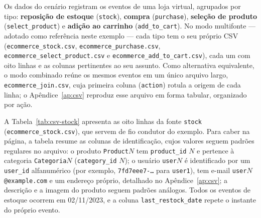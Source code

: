 Os dados do cenário registram os eventos de uma loja virtual, agrupados por tipo:
\textbf{reposição de estoque} (\texttt{stock}), \textbf{compra} (\texttt{purchase}),
\textbf{seleção de produto} (\texttt{select\_product}) e \textbf{adição ao carrinho}
(\texttt{add\_to\_cart}). No modo multifonte --- adotado como referência neste exemplo ---
cada tipo tem o seu próprio CSV (\texttt{ecommerce\_stock.csv},
\texttt{ecommerce\_purchase.csv}, \texttt{ecommerce\_select\_product.csv} e
\texttt{ecommerce\_add\_to\_cart.csv}), cada um com oito linhas e as colunas pertinentes
ao seu assunto. Como alternativa equivalente, o modo combinado reúne os mesmos eventos em
um único arquivo largo, \texttt{ecommerce\_join.csv}, cuja primeira coluna
(\texttt{action}) rotula a origem de cada linha; o Apêndice~\ref{ap:csv} reproduz esse
arquivo em forma tabular, organizado por ação.

A Tabela~\ref{tab:csv-stock} apresenta as oito linhas da fonte \texttt{stock}
(\texttt{ecommerce\_stock.csv}), que servem de fio condutor do exemplo. Para caber na
página, a tabela resume as colunas de identificação, cujos valores seguem padrões
regulares no arquivo: o produto \texttt{Product}$N$ tem \texttt{product\_id} $N$ e
pertence à categoria \texttt{Categoria}$N$ (\texttt{category\_id} $N$); o usuário
\texttt{user}$N$ é identificado por um \texttt{user\_id} alfanumérico
(por exemplo, \texttt{7fd7eee7-\ldots} para \texttt{user1}), tem e-mail
\texttt{user}$N$\texttt{@example.com} e um endereço próprio, detalhado no
Apêndice~\ref{ap:csv}; a descrição e a imagem do produto seguem padrões análogos. Todos
os eventos de estoque ocorrem em 02/11/2023, e a coluna \texttt{last\_restock\_date}
repete o instante do próprio evento.

